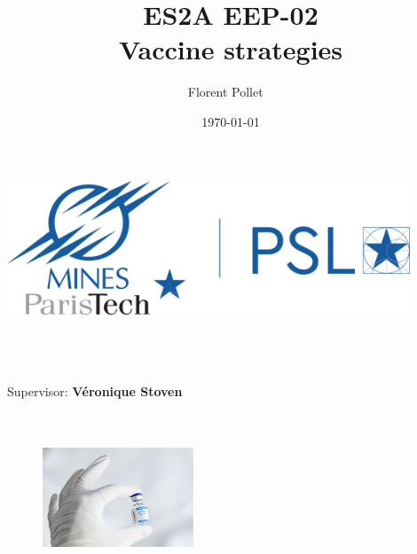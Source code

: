 \title{\Large ES2A EEP-02  \\[0.5cm]
        \bf\Large Vaccine strategies}
\author{\large Florent Pollet \ \\}
\date{\large\today}

\makeatletter
    \begin{titlepage}
        \begin{center}
	   { \includegraphics[width=12cm]{imgs/mp_logo.png}}
	   {\ \\ \ \\}
        \vbox{}\vspace{2cm}
            {\@title }\\[1cm] 
            {\@author}

            {\large \ \\ Supervisor: \bf Véronique Stoven\\ \ \\}
            {\@date\\}

        \end{center}

        \vspace{4cm}
        \begin{figure}[H]
            \centering
            \includegraphics[width=0.4\textwidth]{imgs/vaccineCover.jpg}
        \end{figure}

    \end{titlepage}


